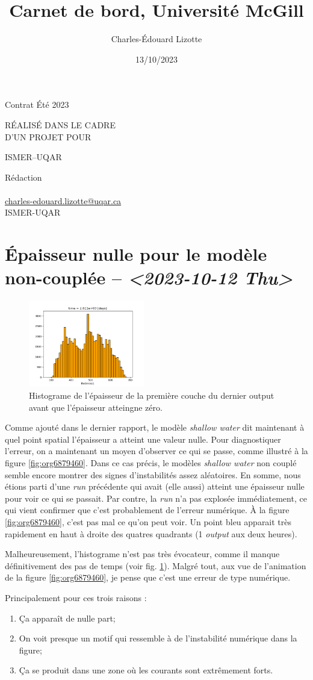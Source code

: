 \documentclass[10pt]{article}
\author{Charles-Édouard Lizotte}
\date{13/10/2023}
\title{Carnet de bord, Université McGill}
\makeatletter
\numberwithin{equation}{section}
\newcommand{\mytitlepage}{
\begin{titlepage}
\begin{center}
{\Large Contrat Été 2023 \par}
\vspace{2cm}
{\Large \MakeUppercase{\thetitle} \par}
\vspace{2cm}
RÉALISÉ DANS LE CADRE\\ D'UN PROJET POUR \par
\vspace{2cm}
{\Large ISMER--UQAR \par}
\vspace{2cm}
{\thedate}
\end{center}
\vfill
Rédaction \\
{\theauthor}\\
\url{charles-edouard.lizotte@uqar.ca}\\
ISMER-UQAR
\end{titlepage}
}
\makeatother
\begin{document}
\mytitlepage
\tableofcontents\newpage

\section{Épaisseur nulle pour le modèle non-couplée -- \textit{<2023-10-12 Thu>}}
\label{sec:orgb26b906}

\begin{figure}\vspace{-\baselineskip} \centering
\centering
\includegraphics[width=0.45\textwidth]{figures/debuggage/2023_10_08_thickness1_histo.png}
\caption{\label{fig:org8d61261}Histograme de l'épaisseur de la première couche du dernier output avant que l'épaisseur atteingne zéro.}
\end{figure}


Comme ajouté dans le dernier rapport, le modèle \emph{shallow water} dit maintenant à quel point spatial l'épaisseur a atteint une valeur nulle.
Pour diagnostiquer l'erreur, on a maintenant un moyen d'observer ce qui se passe, comme illustré à la figure \ref{fig:org6879460}.
Dans ce cas précis, le modèles \emph{shallow water} non couplé semble encore montrer des signes d'instabilités assez aléatoires.
En somme, nous étions parti d'une \emph{run} précédente qui avait (elle aussi) atteint une épaisseur nulle pour voir ce qui se passait.
Par contre, la \emph{run} n'a pas explosée immédiatement, ce qui vient confirmer que c'est probablement de l'erreur numérique.
À la figure \ref{fig:org6879460}, c'est pas mal ce qu'on peut voir.
Un point bleu apparait très rapidement en haut à droite des quatres quadrants (1 \emph{output} aux deux heures). \bigskip

Malheureusement, l'histograme n'est pas très évocateur, comme il manque définitivement des pas de temps (voir fig. \ref{fig:org8d61261}).
Malgré tout, aux vue de l'animation de la figure \ref{fig:org6879460}, je pense que c'est une erreur de type numérique.\bigskip

Principalement pour ces trois raisons : 
\begin{enumerate}
\item Ça apparaît de nulle part;
\item On voit presque un motif qui ressemble à de l'instabilité numérique dans la figure;
\item Ça se produit dans une zone où les courants sont extrêmement forts.
\end{enumerate}
\end{document}
